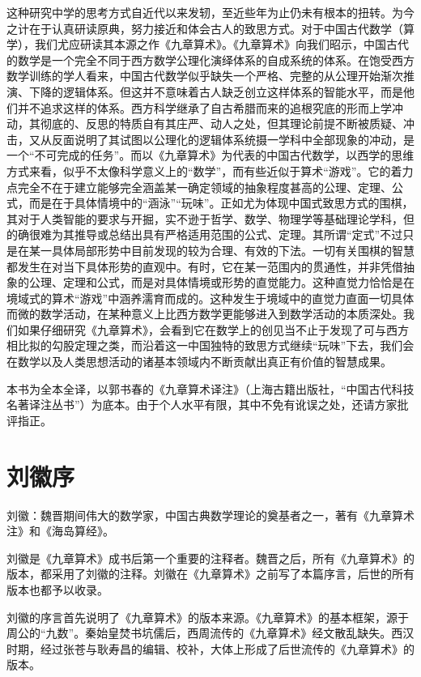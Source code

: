 \documentclass[a4paper,12pt,UTF8,twoside]{ctexbook}
\begin{document}
这种研究中学的思考方式自近代以来发轫，至近些年为止仍未有根本的扭转。为今之计在于认真研读原典，努力接近和体会古人的致思方式。对于中国古代数学（算学），我们尤应研读其本源之作《九章算术》。《九章算术》向我们昭示，中国古代的数学是一个完全不同于西方数学公理化演绎体系的自成系统的体系。在饱受西方数学训练的学人看来，中国古代数学似乎缺失一个严格、完整的从公理开始渐次推演、下降的逻辑体系。但这并不意味着古人缺乏创立这样体系的智能水平，而是他们并不追求这样的体系。西方科学继承了自古希腊而来的追根究底的形而上学冲动，其彻底的、反思的特质自有其庄严、动人之处，但其理论前提不断被质疑、冲击，又从反面说明了其试图以公理化的逻辑体系统摄一学科中全部现象的冲动，是一个“不可完成的任务”。而以《九章算术》为代表的中国古代数学，以西学的思维方式来看，似乎不太像科学意义上的“数学”，而有些近似于算术“游戏”。它的着力点完全不在于建立能够完全涵盖某一确定领域的抽象程度甚高的公理、定理、公式，而是在于具体情境中的“涵泳”“玩味”。正如尤为体现中国式致思方式的围棋，其对于人类智能的要求与开掘，实不逊于哲学、数学、物理学等基础理论学科，但的确很难为其推导或总结出具有严格适用范围的公式、定理。其所谓“定式”不过只是在某一具体局部形势中目前发现的较为合理、有效的下法。一切有关围棋的智慧都发生在对当下具体形势的直观中。有时，它在某一范围内的贯通性，并非凭借抽象的公理、定理和公式，而是对具体情境或形势的直觉能力。这种直觉力恰恰是在境域式的算术“游戏”中涵养濡育而成的。这种发生于境域中的直觉力直面一切具体而微的数学活动，在某种意义上比西方数学更能够进入到数学活动的本质深处。我们如果仔细研究《九章算术》，会看到它在数学上的创见当不止于发现了可与西方相比拟的勾股定理之类，而沿着这一中国独特的致思方式继续“玩味”下去，我们会在数学以及人类思想活动的诸基本领域内不断贡献出真正有价值的智慧成果。

本书为全本全译，以郭书春的《九章算术译注》（上海古籍出版社，“中国古代科技名著译注丛书”）为底本。由于个人水平有限，其中不免有讹误之处，还请方家批评指正。



\chapter{刘徽序}
刘徽：魏晋期间伟大的数学家，中国古典数学理论的奠基者之一，著有《九章算术注》和《海岛算经》。

刘徽是《九章算术》成书后第一个重要的注释者。魏晋之后，所有《九章算术》的版本，都采用了刘徽的注释。刘徽在《九章算术》之前写了本篇序言，后世的所有版本也都予以收录。

刘徽的序言首先说明了《九章算术》的版本来源。《九章算术》的基本框架，源于周公的“九数”。秦始皇焚书坑儒后，西周流传的《九章算术》经文散乱缺失。西汉时期，经过张苍与耿寿昌的编辑、校补，大体上形成了后世流传的《九章算术》的版本。
\end{document}

